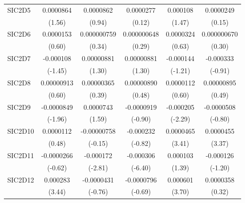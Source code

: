 \begin{table}[htbp]
\begin{tabular}{l*{5}{c}}
SIC2D5      &   0.0000864         &   0.0000862         &   0.0000277         &    0.000108         &   0.0000249         \\
            &      (1.56)         &      (0.94)         &      (0.12)         &      (1.47)         &      (0.15)         \\
SIC2D6      &   0.0000153         & 0.000000759         & 0.000000648         &   0.0000324         & 0.000000670         \\
            &      (0.60)         &      (0.34)         &      (0.29)         &      (0.63)         &      (0.30)         \\
SIC2D7      &   -0.000108         &  0.00000881         &  0.00000881         &   -0.000144         &   -0.000333         \\
            &     (-1.45)         &      (1.30)         &      (1.30)         &     (-1.21)         &     (-0.91)         \\
SIC2D8      &  0.00000913         &  0.00000365         &  0.00000890         &   0.0000112         &  0.00000895         \\
            &      (0.60)         &      (0.39)         &      (0.48)         &      (0.60)         &      (0.49)         \\
SIC2D9      &  -0.0000849         &   0.0000743         &  -0.0000919         &   -0.000205\sym{*}  &  -0.0000508         \\
            &     (-1.96)         &      (1.59)         &     (-0.90)         &     (-2.29)         &     (-0.80)         \\
SIC2D10     &   0.0000112         & -0.00000758         &   -0.000232         &   0.0000465\sym{***}&   0.0000455\sym{***}\\
            &      (0.48)         &     (-0.15)         &     (-0.82)         &      (3.41)         &      (3.37)         \\
SIC2D11     &  -0.0000266         &   -0.000172\sym{**} &   -0.000306\sym{***}&    0.000103         &   -0.000126         \\
            &     (-0.62)         &     (-2.81)         &     (-6.40)         &      (1.39)         &     (-1.20)         \\
SIC2D12     &    0.000283\sym{***}&  -0.0000431         &  -0.0000796         &    0.000601\sym{***}&   0.0000358         \\
            &      (3.44)         &     (-0.76)         &     (-0.69)         &      (3.70)         &      (0.32)         \\

\end{tabular}
\end{table}
